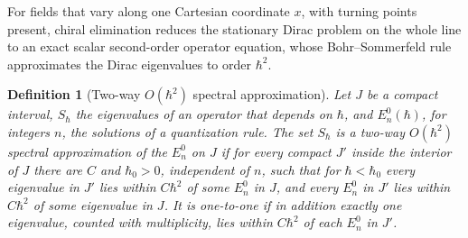 \documentclass[aps,prd,onecolumn,tightenlines,nofootinbib,notitlepage,11pt,floatfix]{revtex4-2}
\theoremstyle{indentedtheorem}
\newtheorem{definition}{Definition}
\begin{document}
For fields that vary along one Cartesian coordinate $x$, with turning points present, chiral elimination reduces the stationary Dirac problem on the whole line to an exact scalar second-order operator equation, whose Bohr--Sommerfeld rule approximates the Dirac eigenvalues to order $\hbar^2$.

\begin{definition}[Two-way $O(\hbar^2)$ spectral approximation]
\label{def:two_way}
Let $J$ be a compact interval, $S_\hbar$ the eigenvalues of an operator that depends on $\hbar$, and $E_n^0(\hbar)$, for integers $n$, the solutions of a quantization rule. The set $S_\hbar$ is a \emph{two-way $O(\hbar^2)$ spectral approximation} of the $E_n^0$ on $J$ if for every compact $J'$ inside the interior of $J$ there are $C$ and $\hbar_0>0$, independent of $n$, such that for $\hbar<\hbar_0$ every eigenvalue in $J'$ lies within $C\hbar^2$ of some $E_n^0$ in $J$, and every $E_n^0$ in $J'$ lies within $C\hbar^2$ of some eigenvalue in $J$. It is \emph{one-to-one} if in addition exactly one eigenvalue, counted with multiplicity, lies within $C\hbar^2$ of each $E_n^0$ in $J'$.
\end{definition}
\end{document}
